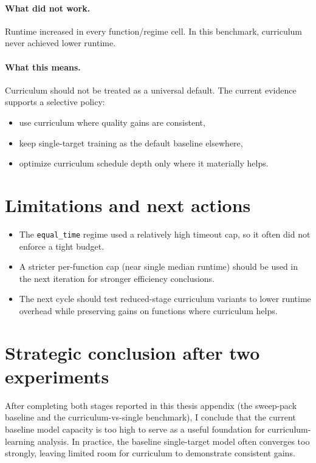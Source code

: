 \paragraph{What did not work.}
Runtime increased in every function/regime cell.
In this benchmark, curriculum never achieved lower runtime.

\paragraph{What this means.}
Curriculum should not be treated as a universal default. The current evidence
supports a selective policy:

\begin{itemize}
    \item use curriculum where quality gains are consistent,
    \item keep single-target training as the default baseline elsewhere,
    \item optimize curriculum schedule depth only where it materially helps.
\end{itemize}

\section{Limitations and next actions}

\begin{itemize}
    \item The \texttt{equal\_time} regime used a relatively high timeout cap,
          so it often did not enforce a tight budget.
    \item A stricter per-function cap (near single median runtime) should be used
          in the next iteration for stronger efficiency conclusions.
    \item The next cycle should test reduced-stage curriculum variants to lower runtime
          overhead while preserving gains on functions where curriculum helps.
\end{itemize}

\section{Strategic conclusion after two experiments}

After completing both stages reported in this thesis appendix
(the sweep-pack baseline and the curriculum-vs-single benchmark),
I conclude that the current baseline model capacity is too high to serve as a
useful foundation for curriculum-learning analysis. In practice, the baseline
single-target model often converges too strongly, leaving limited room for
curriculum to demonstrate consistent gains.

